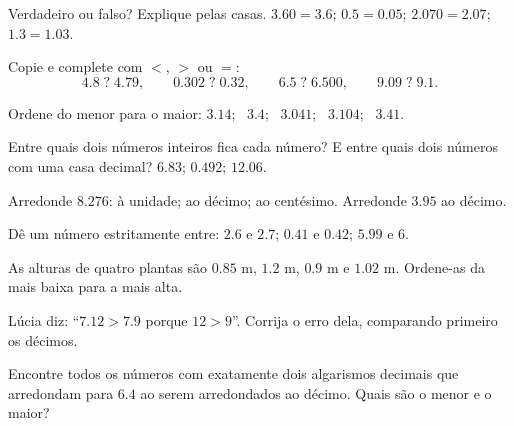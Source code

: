 \begin{exercise}[$\star$]\label{exo:g5:decimals:3}
Verdadeiro ou falso? Explique pelas casas.
$3.60 = 3.6$; \quad $0.5 = 0.05$; \quad $2.070 = 2.07$; \quad
$1.3 = 1.03$.
\end{exercise}

\begin{exercise}[$\star$]\label{exo:g5:decimals:4}
Copie e complete com $<$, $>$ ou $=$:
\[
4.8 \;?\; 4.79, \qquad
0.302 \;?\; 0.32, \qquad
6.5 \;?\; 6.500, \qquad
9.09 \;?\; 9.1 .
\]
\end{exercise}

\begin{exercise}[$\star$]\label{exo:g5:decimals:5}
Ordene do menor para o maior: $3.14$; \ $3.4$; \ $3.041$; \
$3.104$; \ $3.41$.
\end{exercise}

\begin{exercise}[$\star$]\label{exo:g5:decimals:6}
Entre quais dois números inteiros fica cada número? E entre quais
dois números com uma casa decimal? \quad $6.83$; \quad $0.492$; \quad
$12.06$.
\end{exercise}

\begin{exercise}[$\star$]\label{exo:g5:decimals:7}
Arredonde $8.276$: à unidade; ao décimo; ao centésimo. Arredonde
$3.95$ ao décimo.
\end{exercise}

\begin{exercise}[$\star$]\label{exo:g5:decimals:8}
Dê um número estritamente entre: $2.6$ e $2.7$; \quad $0.41$ e
$0.42$; \quad $5.99$ e $6$.
\end{exercise}

\begin{exercise}[$\star$]\label{exo:g5:decimals:9}
As alturas de quatro plantas são $0.85$ m, $1.2$ m, $0.9$ m e
$1.02$ m. Ordene-as da mais baixa para a mais alta.
\end{exercise}

\begin{exercise}[$\star\star$]\label{exo:g5:decimals:10}
Lúcia diz: ``$7.12 > 7.9$ porque $12 > 9$''. Corrija o erro dela,
comparando primeiro os décimos.
\end{exercise}

\begin{exercise}[$\star\star$]\label{exo:g5:decimals:11}
Encontre todos os números com exatamente dois algarismos decimais que
arredondam para $6.4$ ao serem arredondados ao décimo. Quais são o
menor e o maior?
\end{exercise}
